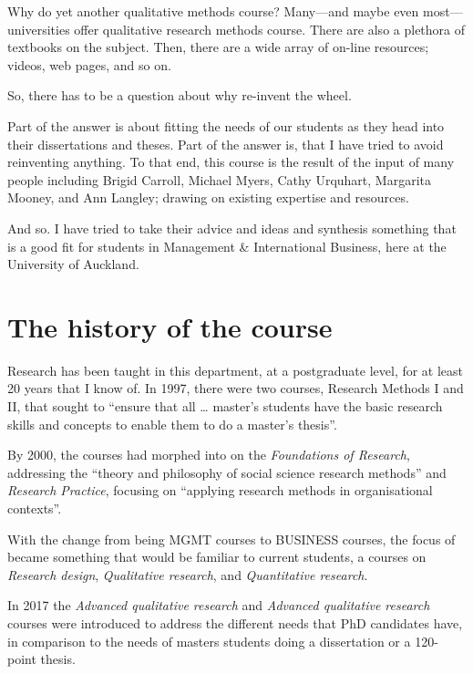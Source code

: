 \documentclass[]{book}
\theoremstyle{definition}
\theoremstyle{definition}
\theoremstyle{definition}
\theoremstyle{remark}
\begin{document}
Why do yet another qualitative methods course? Many---and maybe even
most---universities offer qualitative research methods course. There are
also a plethora of textbooks on the subject. Then, there are a wide
array of on-line resources; videos, web pages, and so on.

So, there has to be a question about why re-invent the wheel.

Part of the answer is about fitting the needs of our students as they
head into their dissertations and theses. Part of the answer is, that I
have tried to avoid reinventing anything. To that end, this course is
the result of the input of many people including Brigid Carroll, Michael
Myers, Cathy Urquhart, Margarita Mooney, and Ann Langley; drawing on
existing expertise and resources.

And so. I have tried to take their advice and ideas and synthesis
something that is a good fit for students in Management \& International
Business, here at the University of Auckland.

\hypertarget{the-history-of-the-course}{%
\section{The history of the course}\label{the-history-of-the-course}}

Research has been taught in this department, at a postgraduate level,
for at least 20 years that I know of. In 1997, there were two courses,
Research Methods I and II, that sought to ``ensure that all \ldots{}
master's students have the basic research skills and concepts to enable
them to do a master's thesis''.

By 2000, the courses had morphed into on the \emph{Foundations of
Research}, addressing the ``theory and philosophy of social science
research methods'' and \emph{Research Practice}, focusing on ``applying
research methods in organisational contexts''.

With the change from being MGMT courses to BUSINESS courses, the focus
of became something that would be familiar to current students, a
courses on \emph{Research design}, \emph{Qualitative research}, and
\emph{Quantitative research}.

In 2017 the \emph{Advanced qualitative research} and \emph{Advanced
qualitative research} courses were introduced to address the different
needs that PhD candidates have, in comparison to the needs of masters
students doing a dissertation or a 120-point thesis.
\end{document}
